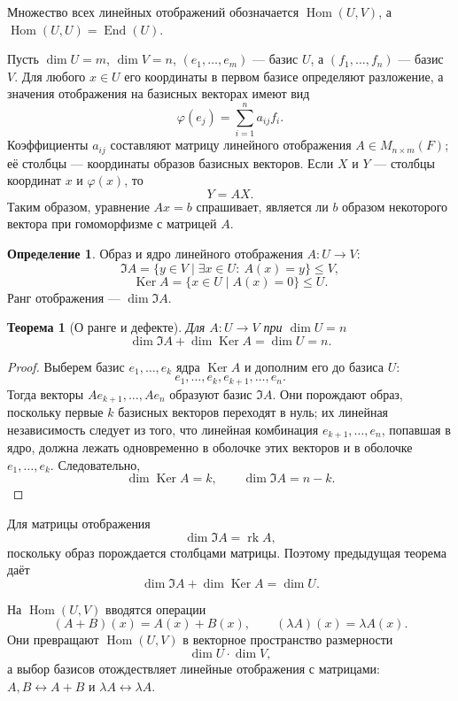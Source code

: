 \documentclass[12pt,a4paper,oneside,openany]{book}
\theoremstyle{definition}
\newtheorem{definition}{Определение}[chapter]
\theoremstyle{plain}
\newtheorem{theorem}{Теорема}[chapter]
\theoremstyle{remark}
\DeclareMathOperator{\Ker}{Ker}
\DeclareMathOperator{\rk}{rk}
\begin{document}
Множество всех линейных отображений обозначается
$\operatorname{Hom}(U,V)$, а
$\operatorname{Hom}(U,U)=\operatorname{End}(U)$.


Пусть $\dim U=m$, $\dim V=n$, $(e_1,\ldots,e_m)$ --- базис $U$, а
$(f_1,\ldots,f_n)$ --- базис $V$. Для любого $x\in U$ его координаты в
первом базисе определяют разложение, а значения отображения на базисных
векторах имеют вид
\[
  \varphi(e_j)=\sum_{i=1}^{n}a_{ij}f_i.
\]
Коэффициенты $a_{ij}$ составляют матрицу линейного отображения
$A\in M_{n\times m}(F)$; её столбцы --- координаты образов базисных
векторов. Если $X$ и $Y$ --- столбцы координат $x$ и $\varphi(x)$, то
\[
  Y=AX.
\]
Таким образом, уравнение $Ax=b$ спрашивает, является ли $b$ образом
некоторого вектора при гомоморфизме с матрицей $A$.

\begin{definition}
Образ и ядро линейного отображения $A\colon U\to V$:
\[
  \Im A=\{y\in V\mid \exists x\in U:\ A(x)=y\}\leq V,
\]
\[
  \Ker A=\{x\in U\mid A(x)=0\}\leq U.
\]
Ранг отображения --- $\dim\Im A$.
\end{definition}

\begin{theorem}[О ранге и дефекте]
Для $A\colon U\to V$ при $\dim U=n$
\[
  \dim\Im A+\dim\Ker A=\dim U=n.
\]
\end{theorem}

\begin{proof}
Выберем базис $e_1,\ldots,e_k$ ядра $\Ker A$ и дополним его до базиса
$U$:
\[
  e_1,\ldots,e_k,e_{k+1},\ldots,e_n.
\]
Тогда векторы $Ae_{k+1},\ldots,Ae_n$ образуют базис $\Im A$.
Они порождают образ, поскольку первые $k$ базисных векторов переходят в
нуль; их линейная независимость следует из того, что линейная комбинация
$e_{k+1},\ldots,e_n$, попавшая в ядро, должна лежать одновременно в
оболочке этих векторов и в оболочке $e_1,\ldots,e_k$. Следовательно,
\[
  \dim\Ker A=k,\qquad \dim\Im A=n-k.
\]
\end{proof}


Для матрицы отображения
\[
  \dim\Im A=\rk A,
\]
поскольку образ порождается столбцами матрицы. Поэтому предыдущая теорема
даёт
\[
  \dim\Im A+\dim\Ker A=\dim U.
\]

На $\operatorname{Hom}(U,V)$ вводятся операции
\[
  (A+B)(x)=A(x)+B(x),
  \qquad
  (\lambda A)(x)=\lambda A(x).
\]
Они превращают $\operatorname{Hom}(U,V)$ в векторное пространство
размерности
\[
  \dim U\cdot\dim V,
\]
а выбор базисов отождествляет линейные отображения с матрицами:
$A,B\leftrightarrow A+B$ и $\lambda A\leftrightarrow\lambda A$.
\end{document}
